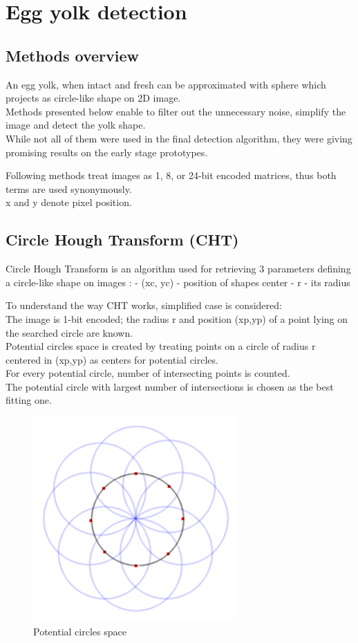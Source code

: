 \documentclass[12pt,twoside,a4paper]{article}
\begin{document}
\section{Egg yolk detection}
\subsection{Methods overview}
An egg yolk, when intact and fresh can be approximated with sphere which projects as circle-like shape on 2D image.\\
Methods presented below enable to filter out the unnecessary noise, simplify the image and detect the yolk shape.\\
While not all of them were used in the final detection algorithm, they were giving promising results on the early stage prototypes.

Following methods treat images as 1, 8, or 24-bit encoded matrices, thus both terms are used synonymously.\\
x and y denote pixel position.

\subsection{Circle Hough Transform (CHT)}
Circle Hough Transform is an algorithm used for retrieving 3 parameters defining a circle-like shape on images\cite{hgtcv} : 
- (xc, yc) - position of shapes center
- r - its radius

To understand the way CHT works, simplified case is considered:\\
The image is 1-bit encoded; the radius r and position (xp,yp) of a point lying on the searched circle are known.\\
Potential circles space is created by treating points on a circle of radius r centered in (xp,yp) as centers for potential circles.\\
For every potential circle, number of intersecting points is counted.\\
The potential circle with largest number of intersections is chosen as the best fitting one.

 
\begin{figure}[H]
\centering
\includegraphics[width=0.4\paperwidth]{space}
\caption{Potential circles space\cite{craters}}
\end{figure}
\end{document}
